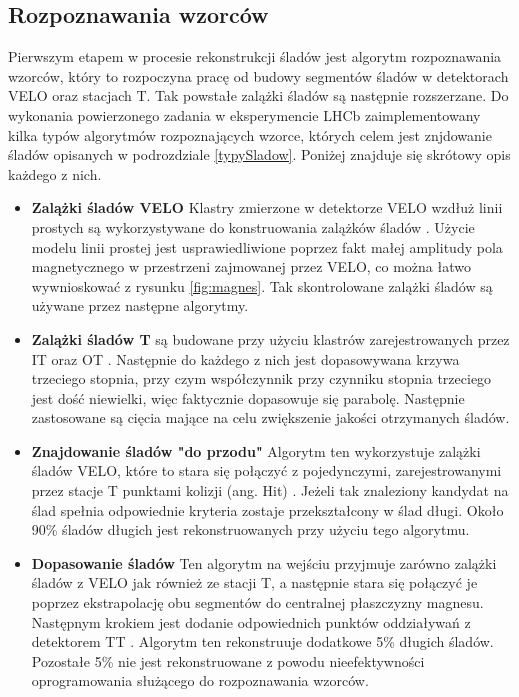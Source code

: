 \subsection{Rozpoznawania wzorców}
Pierwszym etapem w procesie rekonstrukcji śladów jest algorytm rozpoznawania wzorców, który to rozpoczyna pracę od budowy segmentów śladów w detektorach VELO oraz stacjach T. Tak powstałe zalążki śladów są następnie rozszerzane. Do wykonania powierzonego zadania w eksperymencie LHCb zaimplementowany kilka typów algorytmów rozpoznających wzorce, których celem jest znjdowanie śladów opisanych w podrozdziale \ref{typySladow}. Poniżej znajduje się skrótowy opis każdego z nich. 

\begin{itemize}
\item \textbf{Zalążki śladów VELO} Klastry zmierzone w  detektorze VELO wzdłuż linii prostych są wykorzystywane do konstruowania zalążków śladów \cite{VeloPattern}. Użycie modelu linii prostej jest usprawiedliwione poprzez fakt małej amplitudy pola magnetycznego w przestrzeni zajmowanej przez VELO, co można łatwo wywnioskować z rysunku \ref{fig:magnes}. Tak skontrolowane zalążki śladów są używane przez następne algorytmy. 
\item \textbf{Zalążki śladów T} są budowane przy użyciu klastrów zarejestrowanych przez IT oraz OT \cite{TPattern}. Następnie do każdego z nich jest dopasowywana krzywa trzeciego stopnia, przy czym współczynnik przy czynniku stopnia trzeciego jest dość niewielki, więc faktycznie dopasowuje się parabolę. Następnie zastosowane są cięcia mające na celu zwiększenie jakości otrzymanych śladów.
\item \textbf{Znajdowanie śladów "do przodu"}  Algorytm ten wykorzystuje zalążki śladów VELO, które to stara się połączyć z pojedynczymi, zarejestrowanymi przez stacje T punktami kolizji (ang. Hit) \cite{ForwardTracking}. Jeżeli tak znaleziony kandydat na ślad spełnia odpowiednie kryteria zostaje przekształcony w ślad długi. Około 90\% śladów długich jest rekonstruowanych przy użyciu tego algorytmu. 
\item \textbf{Dopasowanie śladów} 
Ten algorytm na wejściu przyjmuje zarówno zalążki śladów z VELO jak również ze stacji T, a następnie stara się połączyć je poprzez ekstrapolację obu segmentów do centralnej płaszczyzny magnesu. Następnym krokiem jest dodanie odpowiednich punktów oddziaływań z detektorem TT \cite{TrackMatching}. Algorytm ten rekonstruuje dodatkowe 5\% długich śladów. Pozostałe 5\% nie jest rekonstruowane z powodu nieefektywności oprogramowania służącego do rozpoznawania wzorców.  

\end{itemize}
